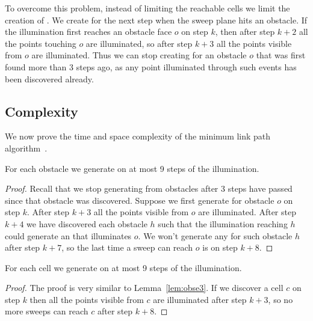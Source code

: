 \documentclass[english,gradu]{tktltiki2018}
\begin{document}
To overcome this problem, instead of limiting the reachable cells we limit the creation of \addEs.
We create \addEs for the next step when the sweep plane hits an obstacle.
If the illumination first reaches an obstacle face $o$ on step $k$, then after step $k+2$ all the points touching $o$ are illuminated, so after step $k+3$ all the points visible from $o$ are illuminated.
Thus we can stop creating \addEs for an obstacle $o$ that was first found more than 3 steps ago, as any point illuminated through such events has been discovered already.

\subsection{Complexity}

We now prove the time and space complexity of the minimum link path algorithm~\cite{restricted}.

\begin{lem}\label{lem:obse3}For each obstacle we generate \obsE on at most 9 steps of the illumination.\end{lem}
\begin{proof}
Recall that we stop generating \addEs from obstacles after 3 steps have passed since that obstacle was discovered.
Suppose we first generate \obsE for obstacle $o$ on step $k$.
After step $k+3$ all the points visible from $o$ are illuminated.
After step $k+4$ we have discovered each obstacle $h$ such that the illumination reaching $h$ could generate an \addE that illuminates $o$.
We won't generate any \addEs for such obstacle $h$ after step $k+7$, so the last time a sweep can reach $o$ is on step $k+8$.
\end{proof}

\begin{lem}\label{lem:celle3}For each cell we generate \cellE on at most 9 steps of the illumination.\end{lem}
\begin{proof}
The proof is very similar to Lemma~\ref{lem:obse3}.
If we discover a cell $c$ on step $k$ then all the points visible from $c$ are illuminated after step $k+3$, so no more sweeps can reach $c$ after step $k+8$.
\end{proof}
\end{document}
